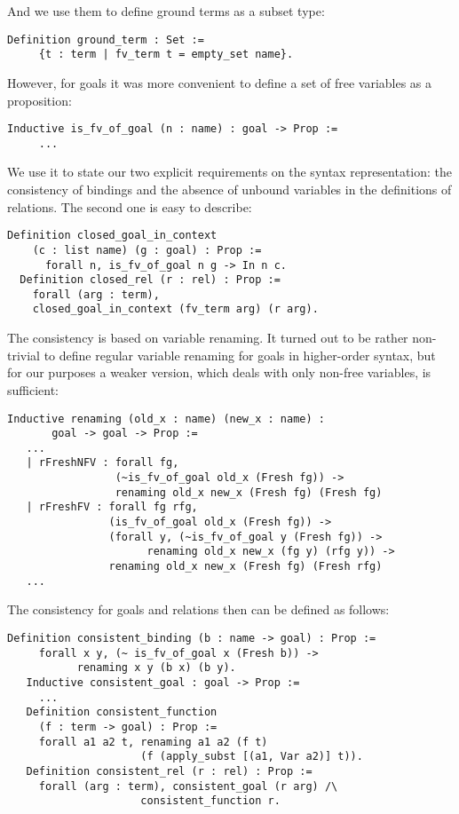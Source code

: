 And we use them to define ground terms as a subset type:

\begin{lstlisting}[language=Coq]
   Definition ground_term : Set :=
     {t : term | fv_term t = empty_set name}.
\end{lstlisting}

However, for goals it was more convenient to define a set of free variables as a proposition:

\begin{lstlisting}[language=Coq]
   Inductive is_fv_of_goal (n : name) : goal -> Prop :=
     ...
\end{lstlisting}

We use it to state our two explicit requirements on the syntax representation: the consistency of bindings and the absence of unbound variables in the definitions of relations. The second one is easy to describe:

\begin{lstlisting}[language=Coq] 
  Definition closed_goal_in_context 
    (c : list name) (g : goal) : Prop :=
      forall n, is_fv_of_goal n g -> In n c.
  Definition closed_rel (r : rel) : Prop :=
    forall (arg : term),
    closed_goal_in_context (fv_term arg) (r arg).
\end{lstlisting}

The consistency is based on variable renaming. It turned out to be rather non-trivial to define regular variable renaming for goals in higher-order syntax, but for our purposes
a weaker version, which deals with only non-free variables, is sufficient:

\begin{lstlisting}[language=Coq]
   Inductive renaming (old_x : name) (new_x : name) :
       goal -> goal -> Prop :=
   ...
   | rFreshNFV : forall fg,
                 (~is_fv_of_goal old_x (Fresh fg)) ->
                 renaming old_x new_x (Fresh fg) (Fresh fg)
   | rFreshFV : forall fg rfg,
                (is_fv_of_goal old_x (Fresh fg)) ->
                (forall y, (~is_fv_of_goal y (Fresh fg)) ->
                      renaming old_x new_x (fg y) (rfg y)) ->
                renaming old_x new_x (Fresh fg) (Fresh rfg)
   ...
\end{lstlisting}

The consistency for goals and relations then can be defined as follows:

\begin{lstlisting}[language=Coq]
   Definition consistent_binding (b : name -> goal) : Prop :=
     forall x y, (~ is_fv_of_goal x (Fresh b)) ->
           renaming x y (b x) (b y).
   Inductive consistent_goal : goal -> Prop :=
     ...
   Definition consistent_function
     (f : term -> goal) : Prop :=
     forall a1 a2 t, renaming a1 a2 (f t)
                     (f (apply_subst [(a1, Var a2)] t)).
   Definition consistent_rel (r : rel) : Prop :=
     forall (arg : term), consistent_goal (r arg) /\
                     consistent_function r.
\end{lstlisting}

